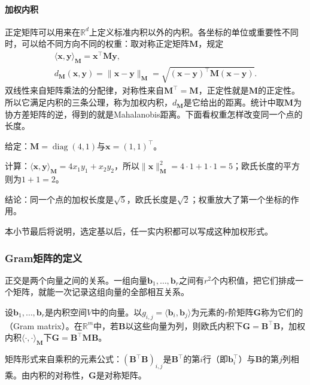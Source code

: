 \paragraph{加权内积}
\label{sec:ls-weighted-inner-products}
正定矩阵可以用来在$\mathbb R^d$上定义标准内积以外的内积。各坐标的单位或重要性不同时，可以给不同方向不同的权重：取对称正定矩阵$\bm M$，规定
\begin{equation}
\begin{gathered}
\langle\bm x,\bm y\rangle_{\bm M}=\bm x^\top\bm M\bm y,\\
d_{\bm M}(\bm x,\bm y)=\lVert\bm x-\bm y\rVert_{\bm M}=\sqrt{(\bm x-\bm y)^\top\bm M(\bm x-\bm y)}.
\end{gathered}
\label{eq:linear-algebra-mahalanobis-pseudodistance}
\end{equation}
双线性来自矩阵乘法的分配律，对称性来自$\bm M^\top=\bm M$，正定性就是$\bm M$的正定性。所以它满足内积的三条公理，称为加权内积，$d_{\bm M}$是它给出的距离。统计中取$\bm M$为协方差矩阵的逆，得到的就是Mahalanobis距离。下面看权重怎样改变同一个点的长度。
\begin{example}[加权内积下的长度]
\label{ex:ls-weighted-length}
给定：$\bm M=\operatorname{diag}(4,1)$与$\bm x=(1,1)^\top$。

计算：$\langle\bm x,\bm y\rangle_{\bm M}=4x_1y_1+x_2y_2$，所以$\lVert\bm x\rVert_{\bm M}^2=4\cdot1+1\cdot1=5$；欧氏长度的平方则为$1+1=2$。

结论：同一个点的加权长度是$\sqrt5$，欧氏长度是$\sqrt2$；权重放大了第一个坐标的作用。
\end{example}
本小节最后将说明，选定基以后，任一实内积都可以写成这种加权形式。

\subsubsection{Gram矩阵的定义}
\label{sec:ls-gram-orthogonality}
正交是两个向量之间的关系。一组向量$\bm b_1,\ldots,\bm b_r$之间有$r^2$个内积值，把它们排成一个矩阵，就能一次记录这组向量的全部相互关系。
\begin{definition}[有限向量族的Gram矩阵]
\label{def:linear-algebra-gram-matrix}
设$\bm b_1,\ldots,\bm b_r$是内积空间$V$中的向量。以$g_{i,j}=\langle\bm b_i,\bm b_j\rangle$为元素的$r$阶矩阵$\bm G$称为它们的（Gram matrix）。在$\mathbb R^m$中，若$\bm B$以这些向量为列，则欧氏内积下$\bm G=\bm B^\top\bm B$，加权内积$\langle\cdot,\cdot\rangle_{\bm M}$下$\bm G=\bm B^\top\bm M\bm B$。
\end{definition}
矩阵形式来自乘积的元素公式：$(\bm B^\top\bm B)_{i,j}$是$\bm B^\top$的第$i$行（即$\bm b_i^\top$）与$\bm B$的第$j$列相乘。由内积的对称性，$\bm G$是对称矩阵。

